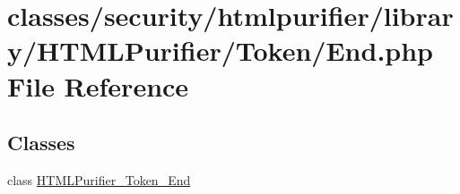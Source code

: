 \hypertarget{End_8php}{\section{classes/security/htmlpurifier/library/\+H\+T\+M\+L\+Purifier/\+Token/\+End.php File Reference}
\label{End_8php}
}
\subsection*{Classes}
\begin{DoxyCompactItemize}
\item 
class \hyperlink{classHTMLPurifier__Token__End}{H\+T\+M\+L\+Purifier\+\_\+\+Token\+\_\+\+End}
\end{DoxyCompactItemize}
